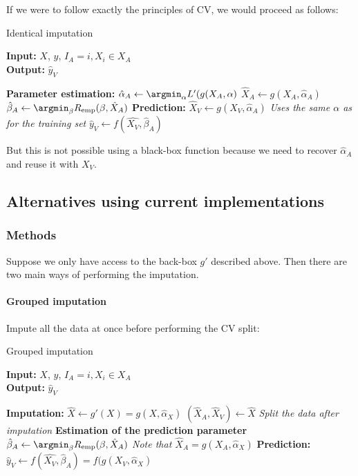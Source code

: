 If we were to follow exactly the principles of CV, we would proceed as follows: 
\begin{algorithm}[H]
	\caption{Identical imputation}
	\hspace*{\algorithmicindent} \textbf{Input:} $X$, $y$, $I_A={i, X_i \in X_A}$  \\
 	\hspace*{\algorithmicindent} \textbf{Output:} $\hat{y}_V$
	\begin{algorithmic}[1]
		\State \textbf{Parameter estimation:}
		\Indstate $\hat{\alpha}_A \leftarrow \argmin_{\alpha} L'(g(X_A,\alpha)$
		\Indstate $\hat{X}_A \leftarrow g(X_A, \hat{\alpha}_A)$
		\Indstate $\hat{\beta}_A \leftarrow \argmin_{\beta} R_{\text{emp}}(\beta,\hat{X}_A)$
		\State \textbf{Prediction:}
		\Indstate $\hat{X}_V \leftarrow g(X_V, \hat{\alpha}_A)$ \Comment \emph{Uses the same $\alpha$ as for the training set}
		\Indstate $\hat{y}_V \leftarrow f(\hat{X_V}, \hat{\beta}_A)$
	\end{algorithmic}
\end{algorithm}

But this is not possible using a black-box function because we need to recover $\hat{\alpha}_A$ and reuse it with $X_V$.

		\subsection{Alternatives using current implementations}
			\subsubsection{Methods}

Suppose we only have access to the back-box $g'$ described above. Then there are two main ways of performing the imputation.

\paragraph{Grouped imputation} 

Impute all the data at once before performing the CV split:
\begin{algorithm}[H]
	\caption{Grouped imputation}
	\hspace*{\algorithmicindent} \textbf{Input:} $X$, $y$, $I_A={i, X_i \in X_A}$  \\
 	\hspace*{\algorithmicindent} \textbf{Output:} $\hat{y}_V$
	\begin{algorithmic}[1]
		\State \textbf{Imputation:}
		\Indstate $\hat{X} \leftarrow g'(X) = g(X, \hat{\alpha}_X)$ 
		\Indstate $(\hat{X}_A, \hat{X}_V) \leftarrow \hat{X}$ \Comment \emph{Split the data after imputation}
		\State \textbf{Estimation of the prediction parameter}
		\Indstate $\hat{\beta}_A \leftarrow \argmin_{\beta} R_{\text{emp}}(\beta,\hat{X}_A)$ \Comment \emph{Note that $\hat{X}_A = g(X_A, \hat{\alpha}_X)$}
		\State \textbf{Prediction:}
		\Indstate $\hat{y}_V \leftarrow f(\hat{X_V}, \hat{\beta}_A) = f(g(X_V, \hat{\alpha}_X)$
	\end{algorithmic}
\end{algorithm}

